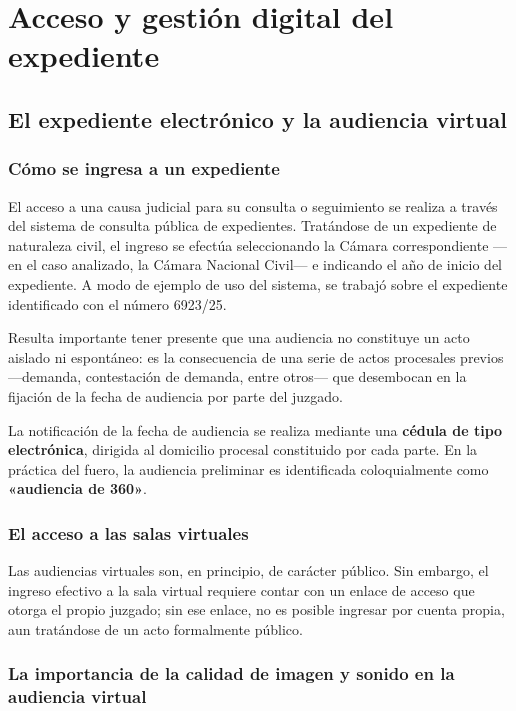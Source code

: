 \documentclass[12pt,oneside]{book}
\begin{document}
\chapter{Acceso y gestión digital del expediente}

\section{El expediente electrónico y la audiencia virtual}

\subsection{Cómo se ingresa a un expediente}

El acceso a una causa judicial para su consulta o seguimiento se realiza a través del sistema de consulta pública de expedientes. Tratándose de un expediente de naturaleza civil, el ingreso se efectúa seleccionando la Cámara correspondiente —en el caso analizado, la Cámara Nacional Civil— e indicando el año de inicio del expediente. A modo de ejemplo de uso del sistema, se trabajó sobre el expediente identificado con el número 6923/25.

Resulta importante tener presente que una audiencia no constituye un acto aislado ni espontáneo: es la consecuencia de una serie de actos procesales previos —demanda, contestación de demanda, entre otros— que desembocan en la fijación de la fecha de audiencia por parte del juzgado.

\begin{note}
La notificación de la fecha de audiencia se realiza mediante una \textbf{cédula de tipo electrónica}, dirigida al domicilio procesal constituido por cada parte. En la práctica del fuero, la audiencia preliminar es identificada coloquialmente como \textbf{«audiencia de 360»}.
\end{note}

\subsection{El acceso a las salas virtuales}

Las audiencias virtuales son, en principio, de carácter público. Sin embargo, el ingreso efectivo a la sala virtual requiere contar con un enlace de acceso que otorga el propio juzgado; sin ese enlace, no es posible ingresar por cuenta propia, aun tratándose de un acto formalmente público.

\subsection{La importancia de la calidad de imagen y sonido en la audiencia virtual}
\end{document}
